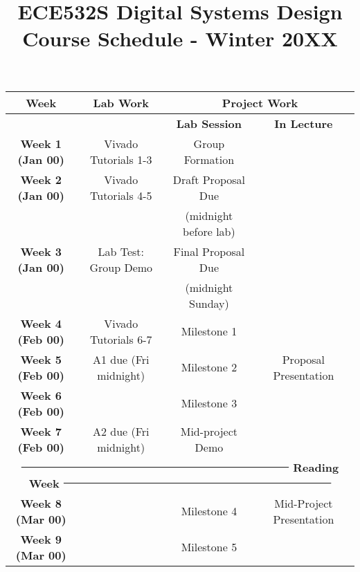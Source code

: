 \documentclass[11pt]{article}
\title{ECE532S Digital Systems Design \\ \vspace{0.4cm}
       \Large Course Schedule - Winter 20XX}
\author{ }
\date{ }
\begin{document}
\maketitle
\vspace{-1cm}

\begin{center}
    
\begin{tabular}{|c|c|c|c|}
    \hline
    \textbf{Week} & \textbf{Lab Work} & \multicolumn{2}{c|}{\textbf{Project Work}} \\
    
    \hline
     & & \textbf{Lab Session} & \textbf{In Lecture} \\
    
    \hline
    \textbf{Week 1 (Jan 00)} & Vivado Tutorials 1-3 & Group Formation& \\
    
    \hline
    \textbf{Week 2 (Jan 00)} & Vivado Tutorials 4-5 & Draft Proposal Due& \\
    &  & (midnight before lab) & \\
    
    \hline
    \textbf{Week 3 (Jan 00)} & Lab Test: Group Demo  & Final Proposal Due & \\
    &  & (midnight Sunday) & \\
    
    \hline
    \textbf{Week 4 (Feb 00)} & Vivado Tutorials 6-7 & Milestone 1 & \\
    
    \hline
    \textbf{Week 5 (Feb 00)} & A1 due (Fri midnight) & Milestone 2 & Proposal Presentation  \\
    
    \hline
    \textbf{Week 6 (Feb 00)} & & Milestone 3 & \\
    
    \hline
    \textbf{Week 7 (Feb 00)} & A2 due (Fri midnight) &  Mid-project Demo & \\
    
    \hline
    \multicolumn{4}{|c|}{\textbf{ \sout{~~~~~~~~~~~~~~~~~~~~~~~~~~~~~~~~~~~~~~~~~~} \textbf{Reading Week} \sout{~~~~~~~~~~~~~~~~~~~~~~~~~~~~~~~~~~~~~~~~~~}  }} \\

    \hline
    \textbf{Week 8 (Mar 00)} & & Milestone 4 & Mid-Project Presentation \\
    
    \hline
    \textbf{Week 9 (Mar 00)} & & Milestone 5 & \\
    

\end{tabular}
\end{center}
\end{document}
